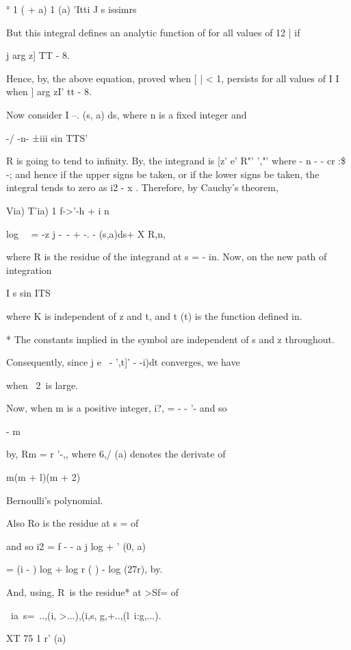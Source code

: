 {{° 1 ( + a) 1 (a) 'Itti J s issimrs

But this integral defines an analytic function of for all values of 12
| if

j arg z] TT - 8.

Hence, by, the above equation, proved when [ | < 1, persists for
all values of I I when ] arg zI' tt - 8.

Now consider I --. (s, a) ds, where n is a fixed integer and

-/ -n- ±iii sin TTS'

R is going to tend to infinity. By, the integrand is [z' e'
R"' ',"' where - n - - cr :\$ -; and hence if the upper signs be
taken, or if the lower signs be taken, the integral tends to zero as
i2 - x . Therefore, by Cauchy's theorem,

Via) T'ia) 1 f->'-h + i n

log \ \ = -z j -~- + -. - (s,a)ds+ X R,n,

where R is the residue of the integrand at s = - in. Now, on the new
path of integration

I s sin ITS \

where K is independent of z and t, and t (t) is the function defined
in.

* The constants implied in the symbol are independent of s and z
throughout.

%
%

Consequently, since j e~ - ',t]' - -i)dt converges, we have

when \ 2\ is large.

Now, when m is a positive integer, i?, = - - '- and so

- m

by, Rm = r '-,, where 6,/ (a) denotes the derivate of

m(m + l)(m + 2)

Bernoulli's polynomial.

Also Ro is the residue at s = of

and so i2 = f - - a j log + ' (0, a)

= (i - ) log + log r ( ) - log (27r), by.

And, using, R\, is the residue* at >Sf= of

\ ia\ s=\ ..,(i, >...),(i,s, g,+..,(l\ i:g,...).

XT 75 1 r' (a)

}}
